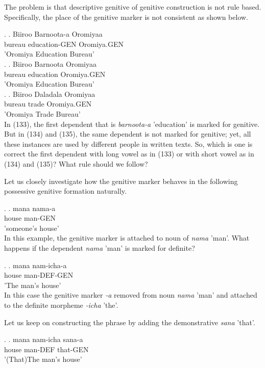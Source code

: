 \documentclass[11pt,a4paper]{article}
\begin{document}
	The problem is that descriptive genitive of genitive construction is not rule based. Specifically, the place of the genitive marker is not consistent as shown below.
	
	\ex.
	\ag.
	Biiroo Barnoota-a Oromiyaa\\
	bureau education-GEN Oromiya.GEN\\
	'Oromiya Education Bureau'\\
	
	\ex.
	\ag.
	Biiroo Barnoota Oromiyaa\\
	bureau education Oromiya.GEN\\
	'Oromiya Education Bureau'\\
	
	
	\ex.
	\ag.
	Biiroo Daladala Oromiyaa\\
	bureau trade Oromiya.GEN\\
	'Oromiya Trade Bureau'\\
	
	In (133), the first dependent that is \emph{barnoota-a} 'education' is marked for genitive. But in (134) and (135), the same dependent is not marked for genitive; yet, all these instances are used by different people in written texts. So, which is one is correct the first dependent with long vowel as in (133) or with short vowel as in (134) and (135)? What rule should we follow?	
	
	
	Let us closely investigate how the genitive marker behaves in the following possessive genitive formation naturally. 
	
	\ex.
	\ag.
	mana nama-a\\
	house man-GEN\\
	'someone's house'\\ 
	
	In this example, the genitive marker is attached to noun of \emph{nama} 'man'. What happens if the dependent \emph{nama} 'man' is marked for definite?
	
	\ex.
	\ag.
	mana nam-icha-a\\
	house man-DEF-GEN\\
	'The man's house'\\ 
	
	In this case the genitive marker \emph{-a} removed from noun \emph{nama} 'man' and attached to the definite morpheme \emph{-icha} 'the'. 
	
	Let us keep on constructing the phrase by adding the demonstrative \emph{sana} 'that'. 
	
	\ex.
	\ag.
	mana nam-icha sana-a\\
	house man-DEF that-GEN\\
	'(That)The man's house'\\ 
	
\end{document}
